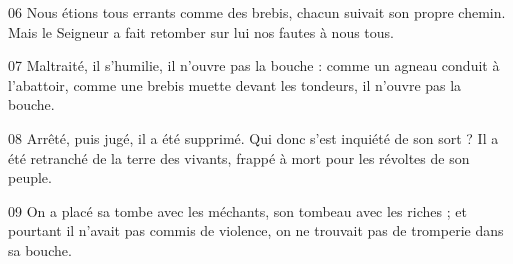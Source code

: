 
06 Nous étions tous errants comme des brebis, chacun suivait son propre chemin. Mais le Seigneur a fait retomber sur lui nos fautes à nous tous.

07 Maltraité, il s’humilie, il n’ouvre pas la bouche : comme un agneau conduit à l’abattoir, comme une brebis muette devant les tondeurs, il n’ouvre pas la bouche.

08 Arrêté, puis jugé, il a été supprimé. Qui donc s’est inquiété de son sort ? Il a été retranché de la terre des vivants, frappé à mort pour les révoltes de son peuple.

09 On a placé sa tombe avec les méchants, son tombeau avec les riches ; et pourtant il n’avait pas commis de violence, on ne trouvait pas de tromperie dans sa bouche.
